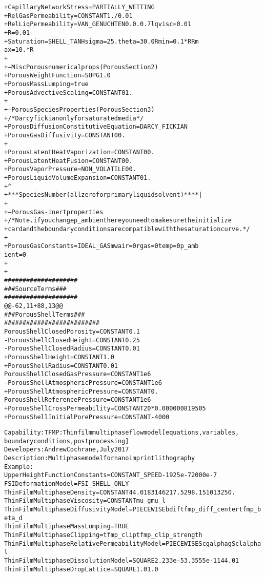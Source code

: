 \documentclass{article}
\begin{document}
\begin{alltt}
+Capillary Network Stress = PARTIALLY_WETTING
+Rel Gas Permeability     = CONSTANT  {1./0.01} 
+Rel Liq Permeability     = VAN_GENUCHTEN  0. 0. 0.7 {lqvisc=0.01}
+{R=0.01} 
+Saturation             = SHELL_TANH {sigma=25.} {theta=30.0} {Rmin = 0.1*R} {Rm
ax = 10.*R}
+
+--Misc Porous numerical props (Porous Section 2)
+Porous Weight Function          = SUPG 1.0
+Porous Mass Lumping             = true
+Porous Advective Scaling         = CONSTANT 0 1.
+
+---Porous Species Properties (Porous Section 3)
+/* Darcy fickian only for saturated media */
+Porous Diffusion Constitutive Equation = DARCY_FICKIAN
+Porous Gas Diffusivity              = CONSTANT  0  0.
+
+Porous Latent Heat Vaporization = CONSTANT  0   0.
+Porous Latent Heat Fusion       = CONSTANT  0   0.
+Porous Vapor Pressure           = NON_VOLATILE  0   0.
+Porous Liquid Volume Expansion  = CONSTANT  0   1.
+                                            ^
+***Species Number (all zero for primary liquid solvent)****|
+
+--Porous Gas-inert properties
+/*Note. if you change p_ambient here you need to make sure the initialize
+card and the boundary conditions are compatible with the saturation curve. */
+
+Porous Gas Constants           = IDEAL_GAS   {mwair=0} {rgas=0} {temp=0} {p_amb
ient=0}
+
+
 ####################
 ### Source Terms ###
 ####################
@@ -62,11 +88,13 @@
 ### Porous Shell Terms ###
 ##########################
 Porous Shell Closed Porosity     = CONSTANT 0.1
-Porous Shell Closed Height       = CONSTANT 0.25
-Porous Shell Closed Radius       = CONSTANT 0.01
+Porous Shell Height              = CONSTANT 1.0
+Porous Shell Radius              = CONSTANT 0.01
 Porous Shell Closed Gas Pressure = CONSTANT 1e6
-Porous Shell Atmospheric Pressure = CONSTANT 1e6
+Porous Shell Atmospheric Pressure = CONSTANT 0.
 Porous Shell Reference Pressure   = CONSTANT 1e6
+Porous Shell Cross Permeability = CONSTANT {20*0.000000819505}
+Porous Shell Initial Pore Pressure = CONSTANT -4000

Capability: TFMP: Thin film multiphase flow model [equations, variables, 
boundary conditions, post processing]
Developers: Andrew Cochrane, July 2017
Description: Multiphase model for nanoimprint lithography
Example:
Upper Height Function Constants = CONSTANT_SPEED -1925e-7 2000e-7
FSI Deformation Model = FSI_SHELL_ONLY
Thin Film Multiphase Density = CONSTANT {44.01} {83146217.5} {298.15} {1013250.}
Thin Film Multiphase Viscosity  = CONSTANT {mu_g} {mu_l}
Thin Film Multiphase Diffusivity Model = PIECEWISE {bdif} {tfmp_diff_center} {tfmp_beta_d}
Thin Film Multiphase Mass Lumping = TRUE
Thin Film Multiphase Clipping = {tfmp_clip} {tfmp_clip_strength}
Thin Film Multiphase Relative Permeability Model = PIECEWISE {Scg} {alphag} {Scl} {alphal}
Thin Film Multiphase Dissolution Model = SQUARE 2.233e-5 3.3555e-11 44.01
Thin Film Multiphase Drop Lattice = SQUARE 1.0 1.0


\end{alltt}
\end{document}

